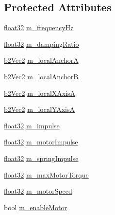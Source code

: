 \subsection*{Protected Attributes}
\begin{DoxyCompactItemize}
\item 
\mbox{\hyperlink{b2_settings_8h_aacdc525d6f7bddb3ae95d5c311bd06a1}{float32}} \mbox{\hyperlink{classb2_wheel_joint_a0570ebb1228c2baca4630c53b77792fa}{m\+\_\+frequency\+Hz}}
\item 
\mbox{\hyperlink{b2_settings_8h_aacdc525d6f7bddb3ae95d5c311bd06a1}{float32}} \mbox{\hyperlink{classb2_wheel_joint_a712554f6a298cf8a69bbf546fa465843}{m\+\_\+damping\+Ratio}}
\item 
\mbox{\hyperlink{structb2_vec2}{b2\+Vec2}} \mbox{\hyperlink{classb2_wheel_joint_a9911353143312dc352928a80c63813c8}{m\+\_\+local\+AnchorA}}
\item 
\mbox{\hyperlink{structb2_vec2}{b2\+Vec2}} \mbox{\hyperlink{classb2_wheel_joint_a1bc3fa1a0bad5eb2cc7b9962976c1d29}{m\+\_\+local\+AnchorB}}
\item 
\mbox{\hyperlink{structb2_vec2}{b2\+Vec2}} \mbox{\hyperlink{classb2_wheel_joint_ae1cadd777bdffbb726b15c438e081c21}{m\+\_\+local\+X\+AxisA}}
\item 
\mbox{\hyperlink{structb2_vec2}{b2\+Vec2}} \mbox{\hyperlink{classb2_wheel_joint_a5e9566b969c24428d32ff2069d4180e3}{m\+\_\+local\+Y\+AxisA}}
\item 
\mbox{\hyperlink{b2_settings_8h_aacdc525d6f7bddb3ae95d5c311bd06a1}{float32}} \mbox{\hyperlink{classb2_wheel_joint_a81a874642cc60caa2eb212eda3b266f0}{m\+\_\+impulse}}
\item 
\mbox{\hyperlink{b2_settings_8h_aacdc525d6f7bddb3ae95d5c311bd06a1}{float32}} \mbox{\hyperlink{classb2_wheel_joint_a1116db6834e3b62a651558f6bdfe000e}{m\+\_\+motor\+Impulse}}
\item 
\mbox{\hyperlink{b2_settings_8h_aacdc525d6f7bddb3ae95d5c311bd06a1}{float32}} \mbox{\hyperlink{classb2_wheel_joint_a83aa86813105dc1189fed8acf1767eb5}{m\+\_\+spring\+Impulse}}
\item 
\mbox{\hyperlink{b2_settings_8h_aacdc525d6f7bddb3ae95d5c311bd06a1}{float32}} \mbox{\hyperlink{classb2_wheel_joint_ad671dcec7ecd41baf87200b2f9c37c34}{m\+\_\+max\+Motor\+Torque}}
\item 
\mbox{\hyperlink{b2_settings_8h_aacdc525d6f7bddb3ae95d5c311bd06a1}{float32}} \mbox{\hyperlink{classb2_wheel_joint_a29194860b36867eb4349eee73e8d5908}{m\+\_\+motor\+Speed}}
\item 
bool \mbox{\hyperlink{classb2_wheel_joint_a46dae5c1e2630430ce7cf00dbccee8a1}{m\+\_\+enable\+Motor}}

\end{DoxyCompactItemize}
